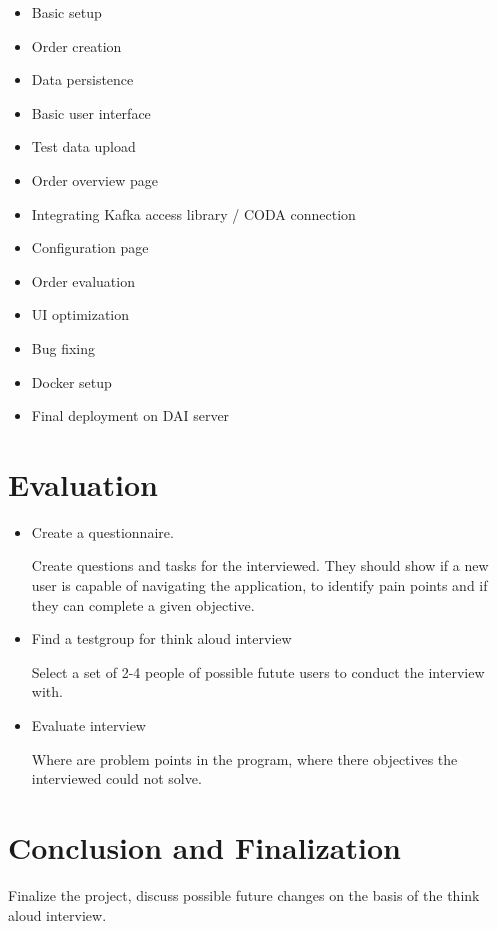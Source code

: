 \documentclass[12pt,a4paper,titlepage,oneside,BCOR1cm]{scrreprt}
\begin{document}
\begin{itemize}
  \item Basic setup
  \item Order creation
  \item Data persistence
  \item Basic user interface
  \item Test data upload
  \item Order overview page
  \item Integrating Kafka access library / CODA connection
  \item Configuration page
  \item Order evaluation
  \item UI optimization  
  \item Bug fixing
  \item Docker setup
  \item Final deployment on DAI server
\end{itemize}

\section{Evaluation}

\begin{itemize}
  \item Create a questionnaire.
  
  Create questions and tasks for the interviewed. They should show if a new user is capable of navigating the application, to identify pain points and if they can complete a given objective.

  \item Find a testgroup for think aloud interview

  Select a set of 2-4 people of possible futute users to conduct the interview with.

  \item Evaluate interview

  Where are problem points in the program, where there objectives the interviewed could not solve.

\end{itemize}

\section{Conclusion and Finalization}

Finalize the project, discuss possible future changes on the basis of the think aloud interview.
\end{document}
